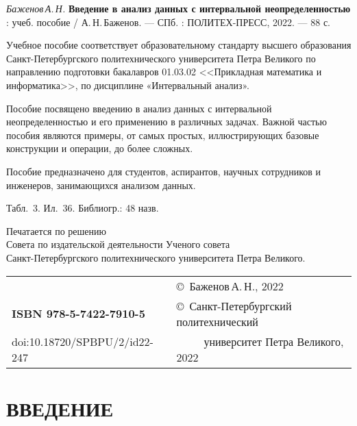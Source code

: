 \documentclass[a5paper,openany]{book}
\begin{document}
{{%
{\it Баженов\,А.\,Н.}
{\bf Введение в анализ данных с интервальной неопределенностью} : учеб. пособие /  А.\,Н.\,Баженов.
--- СПб. : ПОЛИТЕХ-ПРЕСС, 2022. --- 88 с.
\hfill \break

{\small 
	Учебное пособие соответствует образовательному стандарту высшего
	образования Санкт-Петербургского политехнического университета Петра Великого по направлению подготовки бакалавров 01.03.02 <<Прикладная математика и информатика>>, по дисциплине «Интервальный анализ».
	
	
	Пособие посвящено введению в анализ данных с интервальной неопределенностью
	и  его применению в различных задачах.  
	Важной частью пособия являются примеры, от самых простых, иллюстрирующих базовые конструкции и операции, до более сложных.

	Пособие предназначено для студентов, аспирантов, научных сотрудников и инженеров, 
	занимающихся анализом данных.
	
	 
	
	
	\hfill \break
Табл.~3. Ил.~36. Библиогр.: 48 назв.
	\hfill \break
	\hfill \break
	
	\begin{center}
		{\small  	
			Печатается по решению\\
			Совета по издательской деятельности Ученого совета\\
			Санкт-Петербургского политехнического  университета Петра Великого. }
	\end{center}
	
	\hfill \break
	\begin{tabular}{ll}
		~ & \copyright  \ Баженов\,А.\,Н., 2022 \\
{\bf ISBN 978-5-7422-7910-5} & \copyright \
Санкт-Петербургский политехнический \\
doi:10.18720/SPBPU/2/id22-247 & ~~~~~университет Петра Великого, 2022	
\end{tabular}
}	
	
	\thispagestyle{empty}
\newpage
\tableofcontents

\newpage





	\chapter*{ВВЕДЕНИЕ}



}}
\end{document}

